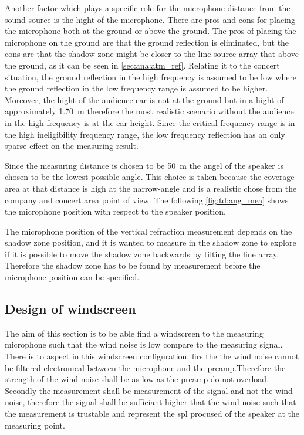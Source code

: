 Another factor which plays a specific role for the microphone distance from the sound source is the hight of the microphone. There are pros and cons for placing the microphone both at the ground or above the ground. The pros of placing the microphone on the ground are that the ground reflection is eliminated, but the cons are that the shadow zone might be closer to the line source array that above the ground, as it can be seen in \autoref{sec:ana:atm_ref}. Relating it to the concert situation, the ground reflection in the high frequency is assumed to be low where the ground reflection in the low frequency range is assumed to be higher. Moreover, the hight of the audience ear is not at the ground but in a hight of approximately \SI{1.70}{\meter} therefore the most realistic scenario without the audience in the high frequency is at the ear height. Since the critical frequency range is in the high ineligibility frequency range, the low frequency reflection has an only sparse effect on the measuring result. 

Since the measuring distance is chosen to be \SI{50}{\meter} the angel of the speaker is chosen to be the lowest possible angle. This choice is taken because the coverage area at that distance is high at the narrow-angle and is a realistic chose from the company and concert area point of view. The following \autoref{fig:td:ang_mea} shows the microphone position with respect to the speaker position.




The microphone position of the vertical refraction measurement depends on the shadow zone position, and it is wanted to measure in the shadow zone to explore if it is possible to move the shadow zone backwards by tilting the line array. Therefore the shadow zone has to be found by measurement before the microphone position can be specified.


\subsection{Design of windscreen}
The aim of this section is to be able find a windscreen to the measuring microphone such that the wind noise is low compare to the measuring signal. There is to aspect in this windscreen configuration, firs the the wind noise cannot be filtered electronical between the microphone and the preamp.Therefore the strength of the wind noise shall be as low as the preamp do not overload. Secondly the measurement shall be measurement of the signal and not the wind noise, therefore the signal shall be sufficiant higher that the wind noise such that the measurement is trustable and represent the \gls{spl} procused of the speaker at the measuring point. 

